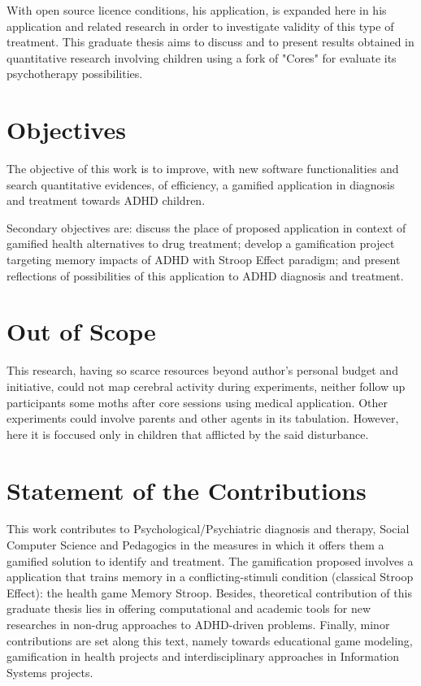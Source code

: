 With open source licence conditions, his application, is expanded here in his application and related research in order to investigate validity of this type of treatment. This graduate thesis aims to discuss and to present results obtained in quantitative research involving children using a fork of "Cores" for evaluate its psychotherapy possibilities. 


\section{Objectives}
\label{sc:objectives}

The objective of this work is to improve, with new software functionalities and search quantitative evidences, of efficiency, a gamified application in diagnosis and treatment towards ADHD children. 

Secondary objectives are: discuss the place of proposed application in context of gamified health alternatives to drug treatment; develop a gamification project targeting memory impacts of ADHD with Stroop Effect paradigm; and present reflections of possibilities of this application to ADHD diagnosis and treatment.

\section{Out of Scope}
\label{sc:outofscope}
This research, having so scarce resources beyond author's personal budget and initiative, could not map cerebral activity during experiments, neither follow up participants some moths after core sessions using medical application. Other experiments could involve parents and other agents in its tabulation. However, here it is foccused only in children that afflicted by the said disturbance.


\section{Statement of the Contributions}

This work contributes to Psychological/Psychiatric diagnosis and therapy, Social Computer Science and Pedagogics in the measures in which it offers them a gamified solution to identify and treatment. The gamification proposed involves a application that trains memory in a conflicting-stimuli condition (classical Stroop Effect): the health game Memory Stroop. Besides, theoretical contribution of this graduate thesis lies in offering computational and academic tools for new researches in non-drug approaches to ADHD-driven problems. Finally, minor contributions are set along this text, namely towards educational game modeling, gamification in health projects and interdisciplinary approaches in Information Systems projects.

